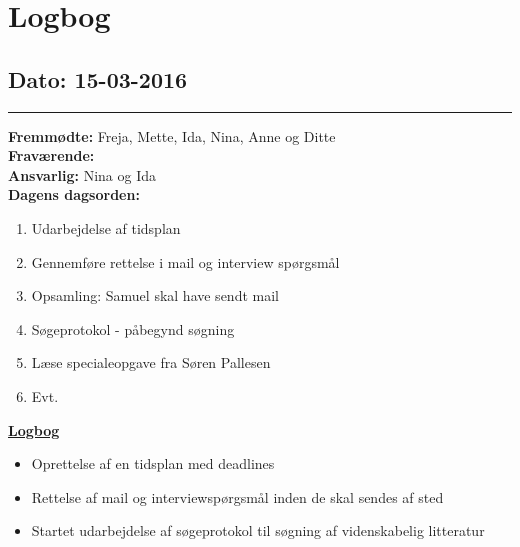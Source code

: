 \chapter{Logbog}
\section{Dato: 15-03-2016}
\hrule
\textbf{Fremmødte:} Freja, Mette, Ida, Nina, Anne og Ditte \\
\textbf{Fraværende: } \\
\textbf{Ansvarlig:} Nina og Ida \\
\textbf{Dagens dagsorden: }
\begin{enumerate}
	\item Udarbejdelse af tidsplan
	\item Gennemføre rettelse i mail og interview spørgsmål
	\item Opsamling: Samuel skal have sendt mail
	\item Søgeprotokol - påbegynd søgning
	\item Læse specialeopgave fra Søren Pallesen
	\item Evt. 
\end{enumerate}

\underline{\textbf{Logbog}}
\begin{itemize}
\item Oprettelse af en tidsplan med deadlines
\item Rettelse af mail og interviewspørgsmål inden de skal sendes af sted
\item Startet udarbejdelse af søgeprotokol til søgning af videnskabelig litteratur
\end{itemize}